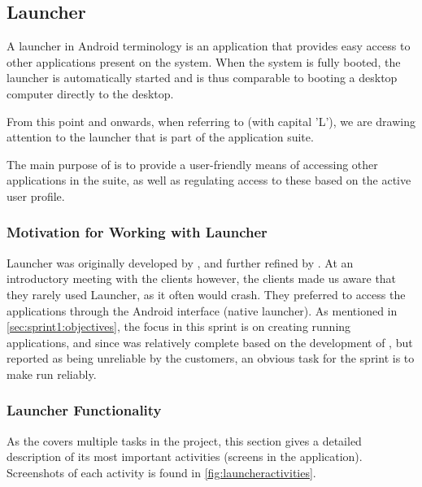 \subsection{Launcher}\label{sec:launcher}
A launcher in Android terminology is an application that provides easy access to other applications present on the system.
When the system is fully booted, the launcher is automatically started and is thus comparable to booting a desktop computer directly to the desktop.

From this point and onwards, when referring to \textit{\launcher} (with capital 'L'), we are drawing attention to the launcher that is part of the \giraf application suite.

The main purpose of \launcher is to provide a user-friendly means of accessing other applications in the \giraf suite, as well as regulating access to these based on the active user profile.

\subsubsection{Motivation for Working with Launcher}
Launcher was originally developed by \citet{launcher2011}, and further refined by \citet{launcher2012}.
At an introductory meeting with the clients however, the clients made us aware that they rarely used Launcher, as it often would crash.
They preferred to access the \giraf applications through the Android interface (native launcher).
As mentioned in \cref{sec:sprint1:objectives}, the focus in this sprint is on creating running applications, and since \launcher was relatively complete based on the development of \citet{launcher2012}, but reported as being unreliable by the customers, an obvious task for the sprint is to make \launcher run reliably.

\subsubsection{Launcher Functionality}
As the \launcher covers multiple tasks in the \giraf project, this section gives a detailed description of its most important activities (screens in the application).
Screenshots of each activity is found in \cref{fig:launcheractivities}.

